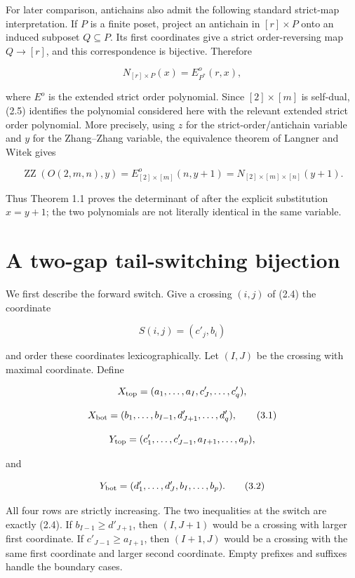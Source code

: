 \documentclass[11pt]{article}
\numberwithin{equation}{section}
\begin{document}
For later comparison, antichains also admit the following standard strict-map
interpretation. If $P$ is a finite poset, project an antichain in $[r]\times P$
onto an induced subposet $Q\subseteq P$. Its first coordinates give a strict
order-reversing map $Q\to[r]$, and this correspondence is bijective. Therefore

\nopagebreak[4]
\[
N_{[r]\times P}(x)=E^o_{P^*}(r,x),
\tag{2.5}
\]

where $E^o$ is the extended strict order polynomial. Since
$[2]\times[m]$ is self-dual, (2.5) identifies the polynomial considered here
with the relevant extended strict order polynomial. More precisely, using $z$
for the strict-order/antichain variable and $y$ for the Zhang--Zhang variable,
the equivalence theorem of Langner and Witek \cite{langner2022} gives

\nopagebreak[4]
\[
\operatorname{ZZ}(O(2,m,n),y)
=E^o_{[2]\times[m]}(n,y+1)
=N_{[2]\times[m]\times[n]}(y+1).
\tag{2.6}
\]

Thus Theorem 1.1 proves the determinant of \cite{he2021} after the explicit substitution
$x=y+1$; the two polynomials are not literally identical in the same variable.

\section{A two-gap tail-switching bijection}


We first describe the forward switch. Give a crossing $(i,j)$ of (2.4) the
coordinate

\nopagebreak[4]
\[
S(i,j)=(c'_j,b_i)
\]

and order these coordinates lexicographically. Let $(I,J)$ be the crossing with
maximal coordinate. Define

\nopagebreak[4]
\[
X_{\rm top}=(a_1,\ldots,a_I,c'_J,\ldots,c'_q),
\]

\nopagebreak[4]
\[
X_{\rm bot}=(b_1,\ldots,b_{I-1},d'_{J+1},\ldots,d'_q),
\tag{3.1}
\]

\nopagebreak[4]
\[
Y_{\rm top}=(c'_1,\ldots,c'_{J-1},a_{I+1},\ldots,a_p),
\]

and

\nopagebreak[4]
\[
Y_{\rm bot}=(d'_1,\ldots,d'_J,b_I,\ldots,b_p).
\tag{3.2}
\]

All four rows are strictly increasing. The two inequalities at the switch are
exactly (2.4). If $b_{I-1}\geq d'_{J+1}$, then $(I,J+1)$ would be a crossing with
larger first coordinate. If $c'_{J-1}\geq a_{I+1}$, then $(I+1,J)$ would be a
crossing with the same first coordinate and larger second coordinate. Empty
prefixes and suffixes handle the boundary cases.
\end{document}
